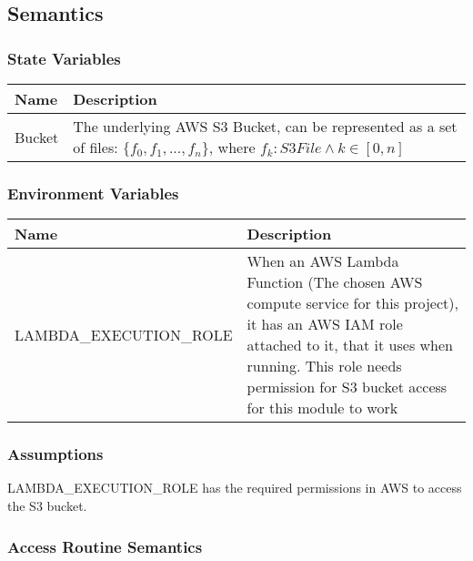 \documentclass[12pt, titlepage]{article}
\begin{document}
{  \subsection{Semantics}

  \subsubsection{State Variables}

  \begin{center}
    \begin{tabular}{p{4cm} p{12cm}}
      \hline
      \textbf{Name} & \textbf{Description} \\
      \hline
      Bucket & The underlying AWS S3 Bucket, can be represented
      as a set of files: $\{f_0, f_1, ..., f_n\}$, where $f_k: S3File
      \land k\in[0,n]$ \\
      \hline
    \end{tabular}
  \end{center}

  \subsubsection{Environment Variables}

  \begin{center}
    \begin{tabular}{p{6cm} p{10cm}}
      \hline
      \textbf{Name} & \textbf{Description} \\
      \hline
      LAMBDA\_EXECUTION\_ROLE & When an AWS Lambda Function (The chosen
      AWS compute service for this project), it has an AWS IAM role
      attached to it, that it uses when running. This role needs
      permission for S3 bucket access for this module to work \\
      \hline
    \end{tabular}
  \end{center}

  \subsubsection{Assumptions}

  LAMBDA\_EXECUTION\_ROLE has the required permissions in AWS to access
  the S3 bucket.

  \subsubsection{Access Routine Semantics}

}
\end{document}

